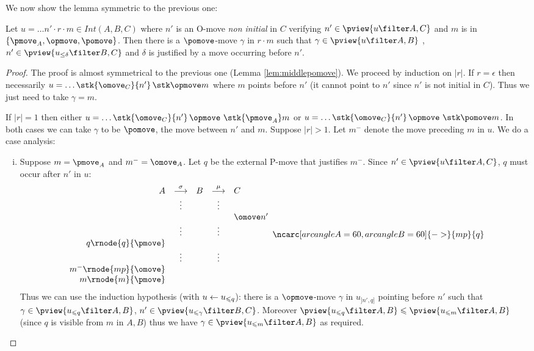 We now show the lemma symmetric to the previous one:
\begin{lemma}
\label{lem:middleopmove}
Let $u = \ldots n' \cdot r \cdot m \in Int(A,B,C)$ where
$n'$ is an O-move \emph{non initial} in $C$ verifying $n' \in \pview{u\filter A,C}$ and $m$ is in $\{\pmove_A, \opmove, \pomove\}$. Then there is a $\pomove$-move $\gamma$ in $r \cdot m$ such that $\gamma \in \pview{u\filter A,B}$ , $n' \in \pview{u_{\leq \delta} \filter B,C}$ and $\delta$ is justified by a move occurring before $n'$.
\end{lemma}
\begin{proof}
The proof is almost symmetrical to the previous one (Lemma \ref{lem:middlepomove}). We proceed by induction on $|r|$.
If $r=\epsilon$ then necessarily $u = \ldots \stk {\omove_C} {n'} \thinspace\stk \opmove m$ where $m$ points before $n'$ (it cannot point to $n'$
since $n'$ is not initial in $C$). Thus we just need to take $\gamma = m$.

If $|r|=1$ then either 
$u = \ldots \stk {\omove_C} {n'} \thinspace\opmove\thinspace\thinspace\stk{\pmove_A} m$
or $u = \ldots \stk {\omove_C} {n'} \thinspace\opmove\thinspace\thinspace\stk \pomove m$.
In both cases we can take $\gamma$ to be $\pomove$, the move between $n'$ and $m$.
Suppose $|r|>1$. Let $m^-$ denote the move preceding $m$ in $u$.
We do a case analysis:
\begin{enumerate}[i.]
\item Suppose $m = \pmove_A$ and $m^- = \omove_A$.
Let $q$ be the external P-move that justifies $m^-$.
Since $n' \in \pview{u\filter A,C}$, $q$ must occur after $n'$ in $u$:
$$ 
\begin{array}{rcccl}
A & \stackrel\sigma{\longrightarrow} & B & \stackrel\mu{\longrightarrow} & C \\
&\vdots&&\vdots\\
&&&& \omove n'\\
&\vdots&&\vdots  \\
q\rnode{q}{\pmove}  \\
&\vdots&&\vdots  \\
m^-\rnode{mp}{\omove}  \\
m \rnode{m}{\pmove}  \\
\end{array}
\ncarc[arcangleA=60,arcangleB=60]{->}{mp}{q}
 $$  
Thus we can use the induction hypothesis (with $u\leftarrow u_{\leqslant q}$): there is a $\opmove$-move $\gamma$ 
in $u_{]n',q]}$ pointing before $n'$ such that $\gamma \in \pview{u_{\prefixof q} \filter A,B}$, $n' \in \pview{u_{\prefixof \gamma} \filter B,C}$.
Moreover $\pview{u_{\prefixof q} \filter A,B} \prefixof \pview{u_{\prefixof m} \filter A,B}$ (since $q$ is visible from $m$ in $A,B$) thus we have $\gamma \in \pview{u_{\prefixof m} \filter A,B}$ as required.


\end{enumerate}
\end{proof}
